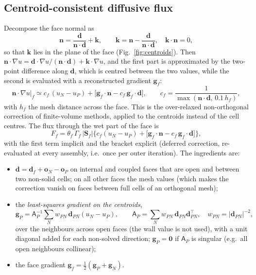 \documentclass[11pt,a4paper]{article}
\theoremstyle{remark}
\newcommand{\nn}{\bm{n}}
\newcommand{\Sf}{\bm{S}_f}
\begin{document}
\subsection{Centroid-consistent diffusive flux}
\label{sec:F1}

Decompose the face normal as
\begin{equation}
\nn=\frac{\bm d}{\nn\cdot\bm d}+\bm k,\qquad \bm k=\nn-\frac{\bm d}{\nn\cdot\bm d},\quad
\bm k\cdot\nn=0 ,
\end{equation}
so that $\bm k$ lies in the plane of the face (Fig.~\ref{fig:centroids}). Then
$\nn\cdot\nabla u=\bm d\cdot\nabla u/(\nn\cdot\bm d)+\bm k\cdot\nabla u$, and the first part
is approximated by the two-point difference along $\bm d$, which is centred between the two
values, while the second is evaluated with a reconstructed gradient $\bm g_f$:
\begin{equation}
\nn\cdot\nabla u\big|_f\simeq c_f\,(u_N-u_P)+\Big[\bm g_f\cdot\nn-c_f\,\bm g_f\cdot\bm d\Big],
\qquad c_f=\frac{1}{\max(\nn\cdot\bm d,\,0.1\,h_f)} ,
\label{eq:f1}
\end{equation}
with $h_f$ the mesh distance across the face. This is the over-relaxed non-orthogonal
correction of finite-volume methods, applied to the centroids instead of the cell centres. The
flux through the wet part of the face is
\begin{equation}
F_f=\theta_f\,\Gamma_f\,|\Sf|\Big\{c_f(u_N-u_P)+\big[\bm g_f\cdot\nn-c_f\,\bm g_f\cdot\bm d\big]\Big\},
\label{eq:F1flux}
\end{equation}
with the first term implicit and the bracket explicit (deferred correction, re-evaluated at
every assembly, i.e.\ once per outer iteration). The ingredients are:
\begin{itemize}\itemsep2pt
\item $\bm d=\bm d_f+\bm o_N-\bm o_P$ on internal and coupled faces that are open and
      between two non-solid cells; on all other faces the mesh values (which makes the
      correction vanish on faces between full cells of an orthogonal mesh);
\item the \emph{least-squares gradient on the centroids},
      \begin{equation}
      \bm g_P=\mathsf A_P^{-1}\sum_{N}w_{PN}\,\bm d_{PN}(u_N-u_P),\qquad
      \mathsf A_P=\sum_Nw_{PN}\,\bm d_{PN}\bm d_{PN}^{\!\top},\quad w_{PN}=|\bm d_{PN}|^{-2},
      \label{eq:lsq}
      \end{equation}
      over the neighbours across open faces (the wall value is not used), with a unit diagonal
      added for each non-solved direction; $\bm g_P=\bm 0$ if $\mathsf A_P$ is singular (e.g.\
      all open neighbours collinear);
\item the face gradient $\bm g_f=\tfrac12(\bm g_P+\bm g_N)$.
\end{itemize}
\end{document}

